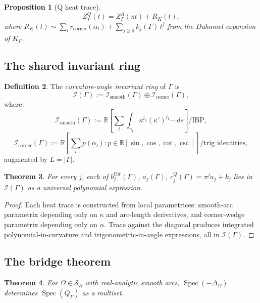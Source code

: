 \documentclass[11pt,reqno]{amsart}
\theoremstyle{plain}
\newtheorem{theorem}{Theorem}[section]
\newtheorem{proposition}[theorem]{Proposition}
\theoremstyle{definition}
\newtheorem{definition}[theorem]{Definition}
\theoremstyle{remark}
\DeclareMathOperator{\Spec}{Spec}
\newcommand{\Reals}{\mathbb{R}}
\newcommand{\Scal}{\mathcal{S}}
\newcommand{\Qop}{Q}
\newcommand{\Lambdaop}{\Lambda}
\newcommand{\Icalbb}{\mathcal{I}}
\begin{document}
\begin{proposition}[Q heat trace]\label{prop:Q-heat}
\[
Z_\Gamma^{\Qop}(t) = Z_\Gamma^{\Lambdaop}(\pi t) + R_K(t),
\]
where $R_K(t) \sim \sum_l r_{\mathrm{corner}}(\alpha_l) + \sum_{j\geq 0}k_j(\Gamma)\,t^j$ from the Duhamel expansion of $K_\Gamma$.
\end{proposition}

\subsection{The shared invariant ring}\label{ss:invariant-ring-shared}

\begin{definition}\label{def:I-star-master}
The \emph{curvature-angle invariant ring} of $\Gamma$ is
\[
\Icalbb(\Gamma) := \Icalbb_{\mathrm{smooth}}(\Gamma) \oplus \Icalbb_{\mathrm{corner}}(\Gamma),
\]
where:
\[
\Icalbb_{\mathrm{smooth}}(\Gamma) := \Reals\left[\sum_l \int_{\gamma_l}\kappa^{i_0}(\kappa')^{i_1}\cdots\,ds\right] / \text{IBP},
\]
\[
\Icalbb_{\mathrm{corner}}(\Gamma) := \Reals\left[\sum_l p(\alpha_l) : p \in \Reals[\sin,\cos,\cot,\csc]\right] / \text{trig identities},
\]
augmented by $L = |\Gamma|$.
\end{definition}

\begin{theorem}\label{thm:shared-ring}
For every $j$, each of $b_j^{\mathrm{Dir}}(\Gamma)$, $a_j(\Gamma)$, $c_j^{\Qop}(\Gamma) = \pi^j a_j + k_j$ lies in $\Icalbb(\Gamma)$ as a universal polynomial expression.
\end{theorem}

\begin{proof}
Each heat trace is constructed from local parametrices: smooth-arc parametrix depending only on $\kappa$ and arc-length derivatives, and corner-wedge parametrix depending only on $\alpha$. Trace against the diagonal produces integrated polynomial-in-curvature and trigonometric-in-angle expressions, all in $\Icalbb(\Gamma)$.
\end{proof}

\subsection{The bridge theorem}\label{ss:bridge-thm}

\begin{theorem}\label{thm:dir-to-Q-master}
For $\Omega \in \Scal_R$ with real-analytic smooth arcs, $\Spec(-\Delta_\Omega)$ determines $\Spec(\Qop_\Gamma)$ as a multiset.
\end{theorem}
\end{document}
